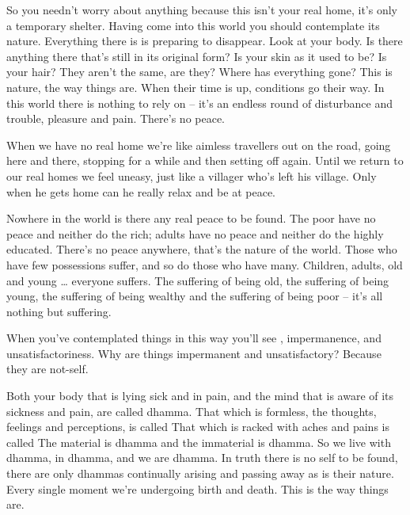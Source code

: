 So you needn't worry about anything because this isn't your real home, it's only a temporary shelter. Having come into this world you should contemplate its nature. Everything there is is preparing to disappear. Look at your body. Is there anything there that's still in its original form? Is your skin as it used to be? Is your hair? They aren't the same, are they? Where has everything gone? This is nature, the way things are. When their time is up, conditions go their way. In this world there is nothing to rely on -- it's an endless round of disturbance and trouble, pleasure and pain. There's no peace. 

When we have no real home we're like aimless travellers out on the road, going here and there, stopping for a while and then setting off again. Until we return to our real homes we feel uneasy, just like a villager who's left his village. Only when he gets home can he really relax and be at peace. 

Nowhere in the world is there any real peace to be found. The poor have no peace and neither do the rich; adults have no peace and neither do the highly educated. There's no peace anywhere, that's the nature of the world. Those who have few possessions suffer, and so do those who have many. Children, adults, old and young \ldots{} everyone suffers. The suffering of being old, the suffering of being young, the suffering of being wealthy and the suffering of being poor -- it's all nothing but suffering. 

When you've contemplated things in this way you'll see , impermanence, and  unsatisfactoriness. Why are things impermanent and unsatisfactory? Because they are  not-self. 

Both your body that is lying sick and in pain, and the mind that is aware of its sickness and pain, are called dhamma. That which is formless, the thoughts, feelings and perceptions, is called  That which is racked with aches and pains is called  The material is dhamma and the immaterial is dhamma. So we live with dhamma, in dhamma, and we are dhamma. In truth there is no self to be found, there are only dhammas continually arising and passing away as is their nature. Every single moment we're undergoing birth and death. This is the way things are. 

